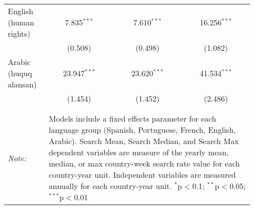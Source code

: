 \begin{table}[!htbp]
\begin{tabular}{@{\extracolsep{5pt}}lccc}
  English (human rights) & 7.835$^{***}$ & 7.610$^{***}$ & 16.256$^{***}$ \\ 
  & (0.508) & (0.498) & (1.082) \\ 
  Arabic (huquq alansan) & 23.947$^{***}$ & 23.620$^{***}$ & 41.534$^{***}$ \\ 
  & (1.454) & (1.452) & (2.486) \\ 
 \hline \\[-1.8ex] 
\hline 
\hline \\[-1.8ex] 
\textit{Note:}  & \multicolumn{3}{l}{\parbox[t]{8cm}{Models include a fixed effects parameter for each language group (Spanish, Portuguese, French, English, Arabic). Search Mean, Search Median, and Search Max dependent variables are measure of the yearly mean, median, or max country-week search rate value for each country-year unit. Independent variables are measured annually for each country-year unit. $^{*}$p$<$0.1; $^{**}$p$<$0.05; $^{***}$p$<$0.01}} \\ 
\end{tabular} 
\end{table} 
